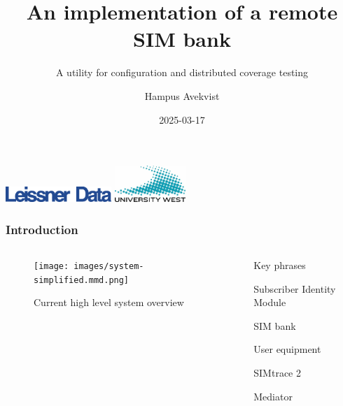 \documentclass[10pt]{beamer}
\title{An implementation of a remote SIM bank}
\subtitle{A utility for configuration and distributed coverage testing}
\author{Hampus Avekvist}
\institute{University West}
\date{2025-03-17}
\renewcommand{\section}[1]{\frametitle{#1}}
\begin{document}
    \begin{frame}
        \includegraphics[width=0.3\textwidth, left]{images/logo-leissner-data.png}
        \titlepage
        \includegraphics[width=0.2\textwidth, right]{images/university-west-logo.jpg}
    \end{frame}

    \begin{frame}
		\section{Introduction}
		\pause

		\begin{columns}
			\begin{column}{0.6\textwidth}
				\begin{figure}
					\texttt{[image: images/system-simplified.mmd.png]}
					\caption{Current high level system overview}
				\end{figure}
			\end{column}
			\begin{column}{0.5\textwidth}
				\pause
				Key phrases
				\begin{description}
					\pause
					\item[SIM] Subscriber Identity Module
					\pause
					\item SIM bank
					\pause
					\item[UE] User equipment
					\pause
					\item SIMtrace 2
					\pause
					\item Mediator
				\end{description}
			\end{column}
		\end{columns}
    \end{frame}
\end{document}
